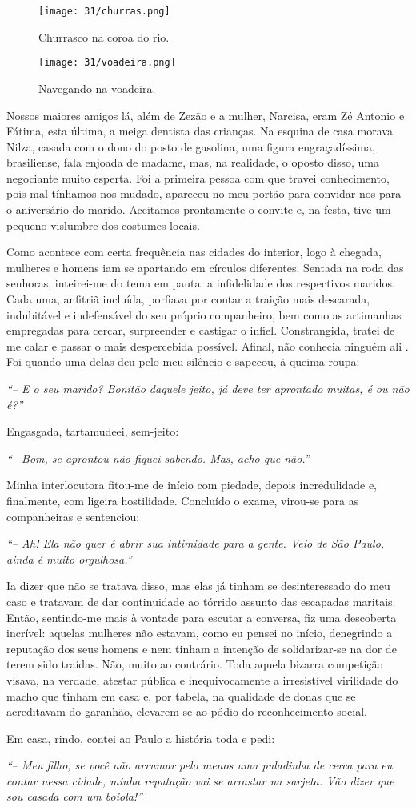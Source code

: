 \begin{figure}
\centering
\texttt{[image: 31/churras.png]}
\caption{Churrasco na coroa do rio.}
\end{figure}

\begin{figure}
\centering
\texttt{[image: 31/voadeira.png]}
\caption{Navegando na voadeira.}
\end{figure}

Nossos maiores amigos lá, além de Zezão e a mulher, Narcisa, eram Zé Antonio e Fátima, esta última, a meiga dentista das crianças.
Na esquina de casa morava Nilza, casada com o dono do posto de gasolina, uma figura engraçadíssima, brasiliense, fala enjoada de madame, mas, na realidade, o oposto disso, uma negociante muito esperta.
Foi a primeira pessoa com que travei conhecimento, pois mal tínhamos nos mudado, apareceu no meu portão para convidar-nos para o aniversário do marido.
Aceitamos prontamente o convite e, na festa, tive um pequeno vislumbre dos costumes locais.

Como acontece com certa frequência nas cidades do interior, logo à chegada, mulheres e homens iam se apartando em círculos diferentes.
Sentada na roda das senhoras, inteirei-me do tema em pauta: a infidelidade dos respectivos maridos.
Cada uma, anfitriã incluída, porfiava por contar a traição mais descarada, indubitável e indefensável do seu próprio companheiro, bem como as artimanhas empregadas para cercar, surpreender e castigar o infiel.
Constrangida, tratei de me calar e passar o mais despercebida possível.
Afinal, não conhecia ninguém ali .
Foi quando uma delas deu pelo meu silêncio e sapecou, à queima-roupa:

\textit{``-- E o seu marido? Bonitão daquele jeito, já deve ter aprontado muitas, é ou não é?''}

Engasgada, tartamudeei, sem-jeito:

\textit{``-- Bom, se aprontou não fiquei sabendo.
Mas, acho que não.''}

Minha interlocutora fitou-me de início com piedade, depois incredulidade e, finalmente, com ligeira hostilidade.
Concluído o exame, virou-se para as companheiras e sentenciou:

\textit{``-- Ah! Ela não quer é abrir sua intimidade para a gente.
Veio de São Paulo, ainda é muito orgulhosa.'' }

Ia dizer que não se tratava disso, mas elas já tinham se desinteressado do meu caso e tratavam de dar continuidade ao tórrido assunto das escapadas maritais.
Então, sentindo-me mais à vontade para escutar a conversa, fiz uma descoberta incrível: aquelas mulheres não estavam, como eu pensei no início, denegrindo a reputação dos seus homens e nem tinham a intenção de solidarizar-se na dor de terem sido traídas.
Não, muito ao contrário.
Toda aquela bizarra competição visava, na verdade, atestar pública e inequivocamente a irresistível virilidade do macho que tinham em casa e, por tabela, na qualidade de donas que se acreditavam do garanhão, elevarem-se ao pódio do reconhecimento social.

Em casa, rindo, contei ao Paulo a história toda e pedi:

\textit{``-- Meu filho, se você não arrumar pelo menos uma puladinha de cerca para eu contar nessa cidade, minha reputação vai se arrastar na sarjeta.
Vão dizer que sou casada com um boiola!''}